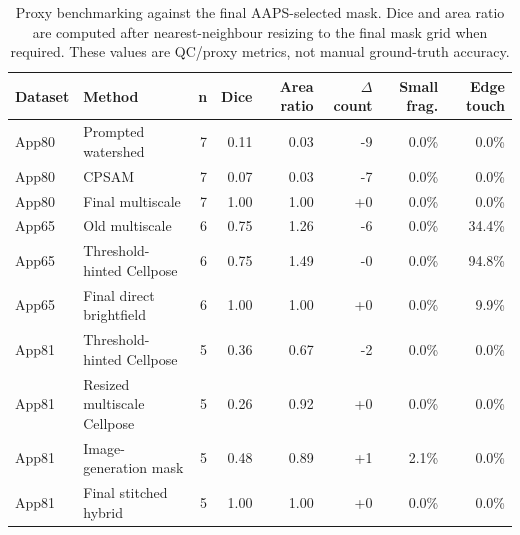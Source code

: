 \begin{table}[p]
\centering
\small
\caption{Proxy benchmarking against the final AAPS-selected mask. Dice and area ratio are computed after nearest-neighbour resizing to the final mask grid when required. These values are QC/proxy metrics, not manual ground-truth accuracy.}
\begin{tabular}{llrrrrrr}
\toprule
Dataset & Method & n & Dice & Area ratio & $\Delta$ count & Small frag. & Edge touch \\
\midrule
App80 & Prompted watershed & 7 & 0.11 & 0.03 & -9 & 0.0\% & 0.0\% \\
App80 & CPSAM & 7 & 0.07 & 0.03 & -7 & 0.0\% & 0.0\% \\
App80 & Final multiscale & 7 & 1.00 & 1.00 & +0 & 0.0\% & 0.0\% \\
App65 & Old multiscale & 6 & 0.75 & 1.26 & -6 & 0.0\% & 34.4\% \\
App65 & Threshold-hinted Cellpose & 6 & 0.75 & 1.49 & -0 & 0.0\% & 94.8\% \\
App65 & Final direct brightfield & 6 & 1.00 & 1.00 & +0 & 0.0\% & 9.9\% \\
App81 & Threshold-hinted Cellpose & 5 & 0.36 & 0.67 & -2 & 0.0\% & 0.0\% \\
App81 & Resized multiscale Cellpose & 5 & 0.26 & 0.92 & +0 & 0.0\% & 0.0\% \\
App81 & Image-generation mask & 5 & 0.48 & 0.89 & +1 & 2.1\% & 0.0\% \\
App81 & Final stitched hybrid & 5 & 1.00 & 1.00 & +0 & 0.0\% & 0.0\% \\
\bottomrule
\end{tabular}
\end{table}
